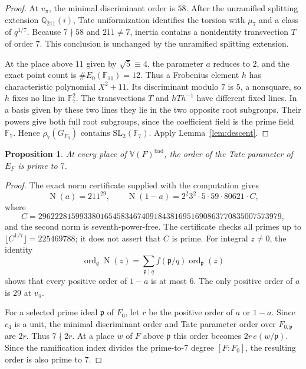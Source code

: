 \documentclass[11pt]{article}
\theoremstyle{plain}
\newtheorem{proposition}[theorem]{Proposition}
\theoremstyle{definition}
\newcommand{\VV}{\mathbb{V}}
\newcommand{\ord}{\operatorname{ord}}
\newcommand{\Norm}{\operatorname{N}}
\begin{document}
\begin{proof}
At $v_\pi$, the minimal discriminant order is $58$.
After the unramified splitting extension $\mathbb Q_{211}(i)$,
Tate uniformization identifies the torsion with
$\mu_7$ and a class of $q^{1/7}$.
Because $7\nmid58$ and $211\ne7$, inertia contains a nonidentity
transvection $T$ of order $7$. This conclusion is unchanged by the
unramified splitting extension.

At the place above $11$ given by $\sqrt5\equiv4$, the parameter $a$ reduces
to $2$, and the exact point count is $\#E_0(\mathbb F_{11})=12$.
Thus a Frobenius element $h$ has characteristic polynomial $X^2+11$.
Its discriminant modulo $7$ is $5$, a nonsquare, so $h$ fixes no line
in $\mathbb F_7^2$. The transvections $T$ and $hTh^{-1}$ have different
fixed lines. In a basis given by these two lines they lie in the two
opposite root subgroups. Their powers give both full root subgroups,
since the coefficient field is the prime field $\mathbb F_7$.
Hence $\rho_7(G_{F_0})$ contains $\mathrm{SL}_2(\mathbb F_7)$.
Apply Lemma~\ref{lem:descent}.
\end{proof}

\begin{proposition}\label{prop:coprime}
At every place of $\VV(F)^{\mathrm{bad}}$, the order of the Tate parameter
of $E_F$ is prime to $7$.
\end{proposition}

\begin{proof}
The exact norm certificate supplied with the computation gives
\[
 \Norm(a)=211^{29},\qquad
 \Norm(1-a)=2^2 3^2\cdot5\cdot59\cdot80621\cdot C,
\]
where
\[
 C=29622281599338016545834674091843816951690863770835007573979,
\]
and the second norm is seventh-power-free. The certificate checks all
primes up to $\lfloor C^{1/7}\rfloor=225469788$; it does not assert
that $C$ is prime.
For integral $z\ne0$, the identity
\[
 \ord_q\Norm(z)=\sum_{\mathfrak p\mid q}
 f(\mathfrak p/q)\ord_{\mathfrak p}(z)
\]
shows that every positive order of $1-a$ is at most $6$.
The only positive order of $a$ is $29$ at $v_\pi$.

For a selected prime ideal $\mathfrak p$ of $F_0$, let $r$ be the positive
order of $a$ or $1-a$. Since $c_4$ is a unit, the minimal discriminant order
and Tate parameter order over $F_{0,\mathfrak p}$ are $2r$.
Thus $7\nmid2r$.
At a place $w$ of $F$ above $\mathfrak p$ this order becomes
$2r\,e(w/\mathfrak p)$. Since the ramification index divides the
prime-to-$7$ degree $[F:F_0]$, the resulting order is also prime to $7$.
\end{proof}
\end{document}

